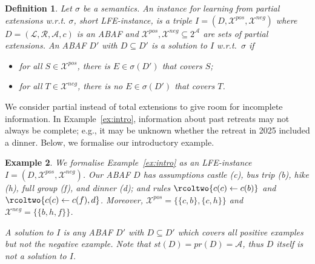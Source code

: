 \documentclass[letterpaper]{article} %
\newcommand{\nb}[1]{\textcolor{red}{!}\marginpar{\textcolor{red}{#1}}}
\newcommand{\stb}{\textit{st}}
\newcommand{\prf}{\textit{pr}}
\newcommand{\atoms}{\mathcal{L}}
\newcommand{\ruleset}{\mathcal{R}}
\newcommand{\assumptions}{\mathcal{A}}
\newcommand{\contra}{c}
\newcommand{\contrary}[1]{c(#1)}
\newcommand{\ABAdef}{D=(\atoms,\ruleset,\assumptions,\contra)}
\newcommand{\Xpos}{\mathcal{X}^{pos}}
\newcommand{\Xneg}{\mathcal{X}^{neg}}
\newtheorem{example}{Example}[section]
\newtheorem{definition}[example]{Definition}
\begin{document}
\begin{definition}
\label{def:LFE}
Let $\sigma$ be a semantics. An \emph{instance for learning from partial extensions w.r.t. $\sigma$}, short \emph{LFE-instance}, is a triple $I=(D,\Xpos,\Xneg)$ where $\ABAdef$ is an ABAF and $\Xpos,\Xneg \subseteq 2^{\mathcal{A}}$ are sets of partial extensions.
An ABAF $D'$ with $D\subseteq D'$ is a \emph{solution} to $I$ w.r.t.\ $\sigma$ if
\begin{itemize}
\item for all $S\in \Xpos$, there is $E\in \sigma(D')$ that covers $S$;
\item 
for all $T\in \Xneg$, there is no $E\in \sigma(D')$ that covers $T$.
\end{itemize} 
\end{definition}
We consider partial instead of total extensions to give room for incomplete information. In Example~\ref{ex:intro}, information about past retreats may not always be complete; e.g., it may be unknown whether the retreat in 2025 included a dinner. 
Below, we formalise our introductory example. 
\begin{example}
    \label{ex:intro formal}
    We formalise Example~\ref{ex:intro} as an LFE-instance $I=(D,\Xpos,\Xneg)$. 
    Our ABAF $D$ has assumptions \emph{castle} (c), \emph{bus trip} (b), \emph{hike} (h), \emph{full group} (f), and \emph{dinner} (d); and rules
    $\rcoltwo{\contrary{c}\gets \contrary{b}}$ and $\rcoltwo{\contrary{c}\gets \contrary{f},d}$.
    Moreover, $\Xpos=\{\{c,b\},\{c,h\}\}$ and $\Xneg=\{\{b,h,f\}\}$.
    
%
%
%   

A solution to $I$ is any ABAF $D'$ with $D\subseteq D'$ which covers all positive examples but not the negative example. Note that $\stb(D)=\prf(D)=\mathcal{A}$, thus $D$ itself is not a solution to $I$. 
\end{example}
\end{document}
